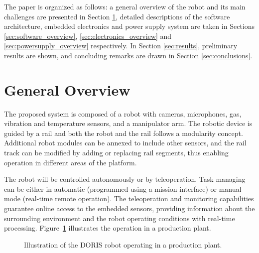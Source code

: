 \documentclass{ifacconf}
\begin{document}
The paper is organized as follows: a general overview of the robot and its main
challenges are presented in Section \ref{sec:general_overview}, detailed
descriptions of the software architecture, embedded electronics and power supply
system are taken in Sections \ref{sec:software_overview},
\ref{sec:electronics_overview} and \ref{sec:powersupply_overview} respectively.
In Section \ref{sec:results}, preliminary results are shown, and concluding
remarks are drawn in Section \ref{sec:conclusions}. 

\section{General Overview}\label{sec:general_overview}

The proposed system is composed of a robot with cameras, microphones, gas,
vibration and temperature sensors, and a manipulator arm. The robotic device is
guided by a rail and both the robot and the rail follows a modularity concept.
Additional robot modules can be annexed to include other sensors, and the rail
track can be modified by adding or replacing rail segments, thus enabling
operation in different areas of the platform.

The robot will be controlled autonomously or by teleoperation. Task managing
can be either in automatic (programmed using a mission interface) or manual
mode (real-time remote operation). The teleoperation and monitoring
capabilities guarantee online access to the embedded sensors, providing
information about the surrounding environment and the robot operating
conditions with real-time processing. Figure~\ref{fig:DORIS-overview}
illustrates the operation in a production plant.

\begin{figure}[ht] 
\centering
{} 
\vspace{-.1cm}
\caption{Illustration of the DORIS robot operating in a production plant.}\vspace{-0.25cm}
\label{fig:DORIS-overview}
\end{figure}
\end{document}
